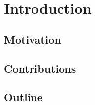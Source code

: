 \chapter{Introduction}
\label{chap:introduction}

\section{Motivation}
\label{sec:motivation}

\section{Contributions}
\label{sec:contributions}

\section{Outline}
\label{sec:outline}
